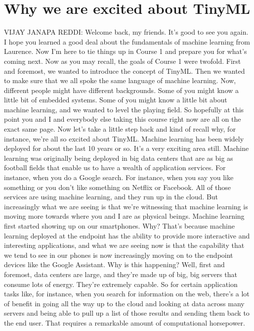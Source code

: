 \section{Why we are excited about TinyML}

VIJAY JANAPA REDDI: Welcome back, my friends.
It's good to see you again.
I hope you learned a good deal about the fundamentals of machine
learning from Laurence.
Now I'm here to tie things up in Course 1
and prepare you for what's coming next.
Now as you may recall, the goals of Course 1 were twofold.
First and foremost, we wanted to introduce the concept of TinyML.
Then we wanted to make sure that we all spoke
the same language of machine learning.
Now, different people might have different backgrounds.
Some of you might know a little bit of embedded systems.
Some of you might know a little bit about machine learning,
and we wanted to level the playing field.
So hopefully at this point you and I and everybody else taking this course right
now are all on the exact same page.
Now let's take a little step back and kind of recall why, for instance, we're
all so excited about TinyML.
Machine learning has been widely deployed for about the last 10 years
or so.
It's a very exciting area still.
Machine learning was originally being deployed
in big data centers that are as big as football fields that enable us to have
a wealth of application services.
For instance, when you do a Google search.
For instance, when you say you like something
or you don't like something on Netflix or Facebook.
All of those services are using machine learning, and they run up in the cloud.
But increasingly what we are seeing is that we're
witnessing that machine learning is moving more towards where
you and I are as physical beings.
Machine learning first started showing up on our smartphones.
Why?
That's because machine learning deployed at the endpoint
has the ability to provide more interactive and interesting
applications, and what we are seeing now is
that the capability that we tend to see in our phones
is now increasingly moving on to the endpoint devices like the Google
Assistant.
Why is this happening?
Well, first and foremost, data centers are large,
and they're made up of big, big servers that consume lots of energy.
They're extremely capable.
So for certain application tasks like, for instance,
when you search for information on the web,
there's a lot of benefit in going all the way up to the cloud
and looking at data across many servers and being
able to pull up a list of those results and sending them back to the end user.
That requires a remarkable amount of computational horsepower.
